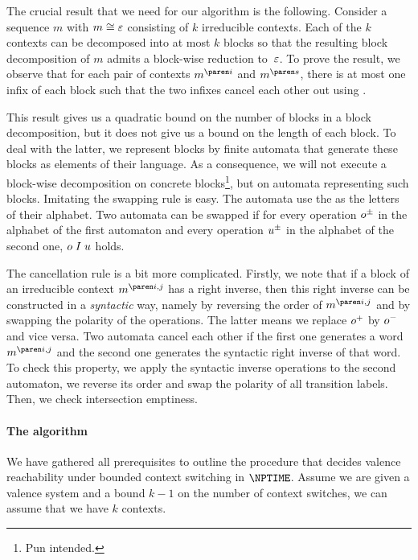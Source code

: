 \documentclass[../../diss.tex]{subfiles}
\begin{document}
The crucial result that we need for our algorithm is the following.
Consider a sequence $m$ with $m \cong \varepsilon$ consisting of $k$ irreducible contexts.
Each of the $k$ contexts can be decomposed into at most $k$ blocks so that the resulting block decomposition of $m$ admits a block-wise reduction to~$\varepsilon$.
To prove the result, we observe that for each pair of contexts $\itr{m}{i}$ and $\itr{m}{s}$, there is at most one infix of each block such that the two infixes cancel each other out using \RuleCancel.

This result gives us a quadratic bound on the number of blocks in a block decomposition, but it does not give us a bound on the length of each block.
To deal with the latter, we represent blocks by finite automata that generate these blocks as elements of their language.
As a consequence, we will not execute a block-wise decomposition on concrete blocks\footnote{Pun intended.}, but on automata representing such blocks.
Imitating the swapping rule is easy.
The automata use the  as the letters of their alphabet.
Two automata can be swapped if for every operation ${o}^\pm$ in the alphabet of the first automaton and every operation ${u}^\pm$ in the alphabet of the second one, $o \mathrel{I} u$ holds.

The cancellation rule is a bit more complicated.
Firstly, we note that if a block of an irreducible context $\itr{m}{i,j}$ has a right inverse, then this right inverse can be constructed in a \emph{syntactic} way, namely by reversing the order of $\itr{m}{i,j}$ and by swapping the polarity of the operations.
The latter means we replace ${o}^+$ by ${o}^-$ and vice versa.
Two automata cancel each other if the first one generates a word $\itr{m}{i,j}$ and the second one generates the syntactic right inverse of that word.
To check this property, we apply the syntactic inverse operations to the second automaton, \ie we reverse its order and swap the polarity of all transition labels.
Then, we check intersection emptiness.

\paragraph{The algorithm}

We have gathered all prerequisites to outline the procedure that decides valence reachability under bounded context switching in $\NPTIME$.
Assume we are given a valence system and a bound $k-1$ on the number of context switches, \ie we can assume that we have $k$ contexts.
\end{document}
